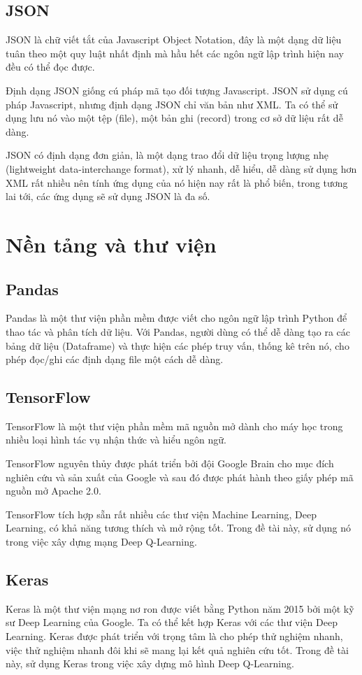 \subsection{JSON}
JSON là chữ viết tắt của Javascript Object Notation, đây là một dạng dữ liệu tuân theo một quy luật nhất định mà hầu hết các ngôn ngữ lập trình hiện nay đều có thể đọc được. 

Định dạng JSON giống cú pháp mã tạo đối tượng Javascript. JSON sử dụng cú pháp Javascript, nhưng định dạng JSON chỉ văn bản như XML. Ta có thể sử dụng lưu nó vào một tệp (file), một bản ghi (record) trong cơ sở dữ liệu rất dễ dàng. 

JSON có định dạng đơn giản, là một dạng trao đổi dữ liệu trọng lượng nhẹ (lightweight data-interchange format), xử lý nhanh, dễ hiểu, dễ dàng sử dụng hơn XML rất nhiều nên tính ứng dụng của nó hiện nay rất là phổ biến, trong tương lai tới, các ứng dụng sẽ sử dụng JSON là đa số.

\section{Nền tảng và thư viện}
\subsection{Pandas}
Pandas là một thư viện phần mềm được viết cho ngôn ngữ lập trình Python để thao tác và phân tích dữ liệu. Với Pandas, người dùng có thể dễ dàng tạo ra các bảng dữ liệu (Dataframe) và thực hiện các phép truy vấn, thống kê trên nó, cho phép đọc/ghi các định dạng file một cách dễ dàng.

\subsection{TensorFlow}
TensorFlow là một thư viện phần mềm mã nguồn mở dành cho máy học trong nhiều loại hình tác vụ nhận thức và hiểu ngôn ngữ.

TensorFlow nguyên thủy được phát triển bởi đội Google Brain cho mục đích nghiên cứu và sản xuất của Google và sau đó được phát hành theo giấy phép mã nguồn mở Apache 2.0.

TensorFlow tích hợp sẵn rất nhiều các thư viện Machine Learning, Deep Learning, có khả năng tương thích và mở rộng tốt. Trong đề tài này, sử dụng nó trong việc xây dựng mạng Deep Q-Learning.

\subsection{Keras}
Keras là một thư viện mạng nơ ron được viết bằng Python năm 2015 bởi một kỹ sư Deep Learning của Google. Ta có thể kết hợp Keras với các thư viện Deep Learning. Keras được phát triển với trọng tâm là cho phép thử nghiệm nhanh, việc thử nghiệm nhanh đôi khi sẽ mang lại kết quả nghiên cứu tốt. Trong đề tài này, sử dụng Keras trong việc xây dựng mô hình Deep Q-Learning.

